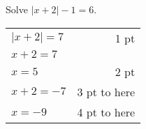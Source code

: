 {
      Solve $\left| x+2 \right | -1=6$.
}
{
	\begin{tabular}{l r}
	$\left| x+2 \right|=7$ & 1 pt\\
	$x+2=7$ & \\
	$x=5$ & 2 pt\\
	$x+2=-7$ & 3 pt to here\\
	$x=-9$ & 4 pt to here
	\end{tabular}
}
